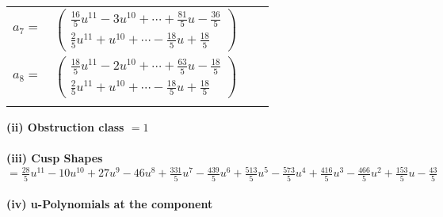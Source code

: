 \documentclass[1p]{elsarticle_modified}
\theoremstyle{definition}
\begin{document}
\begin{tabular}{m{7pt} m{180pt} m{7pt} m{180pt} }
\flushright $a_{7}=$&$\begin{pmatrix}\frac{16}{5} u^{11}-3 u^{10}+\cdots+\frac{81}{5} u-\frac{36}{5}\\\frac{2}{5} u^{11}+u^{10}+\cdots-\frac{18}{5} u+\frac{18}{5}\end{pmatrix}$ \\
\flushright $a_{8}=$&$\begin{pmatrix}\frac{18}{5} u^{11}-2 u^{10}+\cdots+\frac{63}{5} u-\frac{18}{5}\\\frac{2}{5} u^{11}+u^{10}+\cdots-\frac{18}{5} u+\frac{18}{5}\end{pmatrix}$\\&\end{tabular}
\flushleft \textbf{(ii) Obstruction class $= 1$}\\~\\
\flushleft \textbf{(iii) Cusp Shapes $= \frac{28}{5} u^{11}-10 u^{10}+27 u^9-46 u^8+\frac{331}{5} u^7-\frac{439}{5} u^6+\frac{513}{5} u^5-\frac{573}{5} u^4+\frac{416}{5} u^3-\frac{466}{5} u^2+\frac{153}{5} u-\frac{43}{5}$}\\~\\
\newpage\renewcommand{\arraystretch}{1}
\flushleft \textbf{(iv) u-Polynomials at the component}\newline \\
\end{document}
